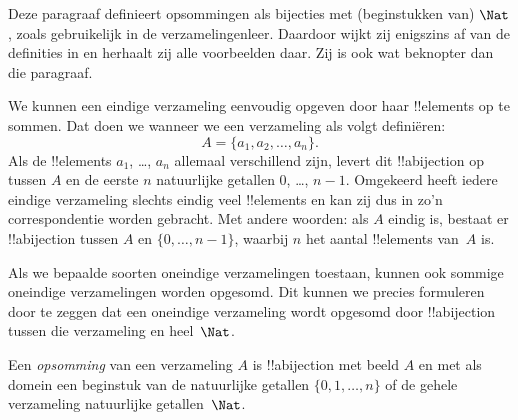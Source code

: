 \documentclass[openany]{memoir}
\begin{document}
\begingroup
\def\olfilename{OLP-0038}
\def\olfilepath{content/sets-functions-relations/size-of-sets/}
\hypertarget{unit-OLP-0038}{}





\begin{editorial}
  Deze paragraaf definieert opsommingen als bijecties met
  (beginstukken van) $\Nat$, zoals gebruikelijk in de
  verzamelingenleer. Daardoor wijkt zij enigszins af van de definities
  in  en herhaalt zij alle voorbeelden daar. Zij is
  ook wat beknopter dan die paragraaf.
\end{editorial}

We kunnen een eindige verzameling eenvoudig opgeven door haar
!!{element}s op te sommen. Dat doen we wanneer we een verzameling als
volgt definiëren:
\[
  A = \{a_1, a_2, \ldots, a_n\}.
\]
Als de !!{element}s $a_1$, \dots, $a_n$ allemaal verschillend zijn,
levert dit !!a{bijection} op tussen $A$ en de eerste $n$ natuurlijke
getallen $0$, \dots, $n-1$. Omgekeerd heeft iedere eindige
verzameling slechts eindig veel !!{element}s en kan zij dus in zo'n
correspondentie worden gebracht. Met andere woorden: als $A$ eindig
is, bestaat er !!a{bijection} tussen $A$ en $\{0, \dots, n-1\}$,
waarbij $n$ het aantal !!{element}s van~$A$ is.

Als we bepaalde soorten oneindige verzamelingen toestaan, kunnen ook
sommige oneindige verzamelingen worden opgesomd. Dit kunnen we precies
formuleren door te zeggen dat een oneindige verzameling wordt
opgesomd door !!a{bijection} tussen die verzameling en heel~$\Nat$.

\begin{defn}
Een \emph{opsomming} van een verzameling $A$ is !!a{bijection} met
beeld $A$ en met als domein een beginstuk van de natuurlijke getallen
$\{0, 1, \ldots, n\}$ {of} de gehele verzameling natuurlijke
getallen~$\Nat$.
\end{defn}
\end{document}
